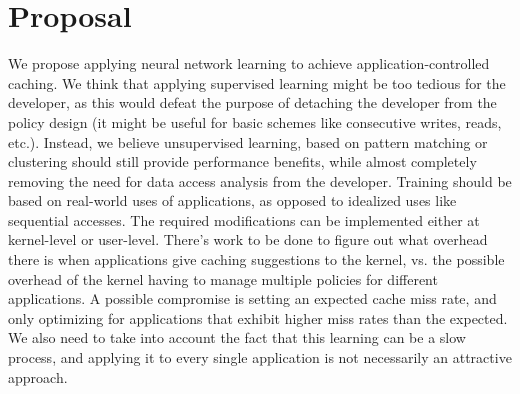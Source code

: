 \section{Proposal}

We propose applying neural network learning to achieve application-controlled
caching.  We think that applying supervised learning might be too tedious for
the developer, as this would defeat the purpose of detaching the developer from
the policy design (it might be useful for basic schemes like consecutive
writes, reads, etc.).  Instead, we believe unsupervised learning, based on
pattern matching or clustering should still provide performance benefits, while
almost completely removing the need for data access analysis from the
developer.  Training should be based on real-world uses of applications, as
opposed to idealized uses like sequential accesses.  The required modifications
can be implemented either at kernel-level or user-level.  There's work to be
done to figure out what overhead there is when applications give caching
suggestions to the kernel, vs.  the possible overhead of the kernel having to
manage multiple policies for different applications.  A possible compromise is
setting an expected cache miss rate, and only optimizing for applications that
exhibit higher miss rates than the expected.  We also need to take into account
the fact that this learning can be a slow process, and applying it to every
single application is not necessarily an attractive approach.
